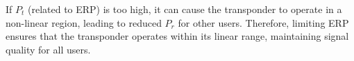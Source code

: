 If \( P_t \) (related to ERP) is too high, it can cause the transponder to operate in a non-linear region, leading to reduced \( P_r \) for other users. Therefore, limiting ERP ensures that the transponder operates within its linear range, maintaining signal quality for all users.

